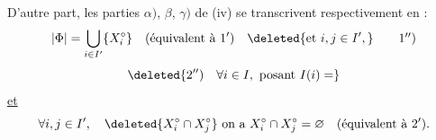 D'autre part, les parties $\alpha)$, $\beta$, $\gamma)$ de (iv) se transcrivent respectivement en :
\[
|\Phi|=\bigcup_{i\in I'}\{X_i^{\circ}\}\quad\text{(équivalent à }1'\text{)}\quad\deleted{\text{et }i,j\in I',}\tag*{$1''$)}
\]
\[
\deleted{2'')\quad\forall i\in I,\text{ posant }I(i)=}
\]
\uline{et}
\[
\forall i,j\in I',\quad\deleted{X_i^{\circ}\cap X_j^{\circ}}\text{ on a }X_i^{\circ}\cap X_j^{\circ}=\varnothing\quad\text{(équivalent à }2'\text{)}.
\]

